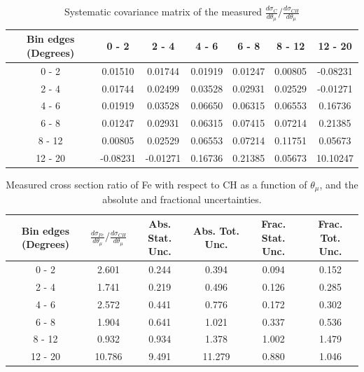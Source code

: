 \documentclass[aps,prl,twocolumn,superscriptaddress,nofootinbib]{revtex4-1}
\begin{document}
\begin{table}[h!]
  \centering
  \caption{Systematic covariance matrix of the measured $\frac{d\sigma_{C}}{d\theta_{\mu}}/\frac{d\sigma_{CH}}{d\theta_{\mu}}$}
    \begin{tabular}{c||cccccc}
      Bin edges (Degrees) & 0 - 2 & 2 - 4 & 4 - 6 & 6 - 8 & 8 - 12 & 12 - 20 \\
\hline \hline
        0 - 2 &  0.01510 &  0.01744 &  0.01919 &  0.01247 &  0.00805 & -0.08231 \\
        2 - 4 &  0.01744 &  0.02499 &  0.03528 &  0.02931 &  0.02529 & -0.01271 \\
        4 - 6 &  0.01919 &  0.03528 &  0.06650 &  0.06315 &  0.06553 &  0.16736 \\
        6 - 8 &  0.01247 &  0.02931 &  0.06315 &  0.07415 &  0.07214 &  0.21385 \\
       8 - 12 &  0.00805 &  0.02529 &  0.06553 &  0.07214 &  0.11751 &  0.05673 \\
      12 - 20 & -0.08231 & -0.01271 &  0.16736 &  0.21385 &  0.05673 & 10.10247 \\
    \end{tabular}
  \label{tablecov:C_Systematic_ThetaMu}
\end{table}

\begin{table}[h!]
  \centering
  \caption{Measured cross section ratio of Fe with respect to CH as a function
  of $\theta_{\mu}$,  and the absolute and fractional uncertainties.}
    \begin{tabular}{c||c||c|c||c|c}
      Bin edges (Degrees) & $\frac{d\sigma_{Fe}}{d\theta_{\mu}}/\frac{d\sigma_{CH}}{d\theta_{\mu}}$ & Abs. Stat. Unc. & Abs. Tot. Unc. & Frac. Stat. Unc. & Frac. Tot. Unc. \\
      \hline\hline
        0 - 2 & 2.601 & 0.244 & 0.394 & 0.094 & 0.152 \\
        2 - 4 & 1.741 & 0.219 & 0.496 & 0.126 & 0.285 \\
        4 - 6 & 2.572 & 0.441 & 0.776 & 0.172 & 0.302 \\
        6 - 8 & 1.904 & 0.641 & 1.021 & 0.337 & 0.536 \\
       8 - 12 & 0.932 & 0.934 & 1.378 & 1.002 & 1.479 \\
      12 - 20 & 10.786 & 9.491 & 11.279 & 0.880 & 1.046 \\
    \end{tabular}
  \label{table:ThetaMuXSecRatio_Fe}
\end{table}
\end{document}
